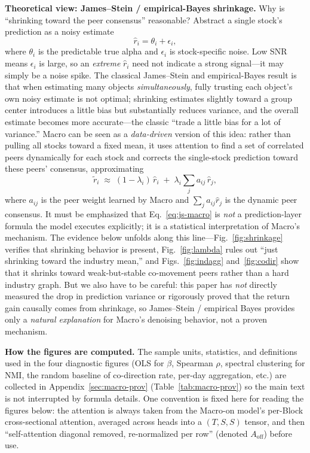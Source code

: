 \documentclass[a4paper,11pt]{article}
\begin{document}
\textbf{Theoretical view: James--Stein / empirical-Bayes shrinkage.} Why
is ``shrinking toward the peer consensus'' reasonable? Abstract a single
stock's prediction as a noisy estimate
\begin{equation}\label{eq:js}
\hat r_i = \theta_i + \epsilon_i,
\end{equation}
where $\theta_i$ is the predictable true alpha and $\epsilon_i$ is
stock-specific noise. Low SNR means $\epsilon_i$ is large, so an \emph{extreme}
$\hat r_i$ need not indicate a strong signal---it may simply be a noise spike.
The classical James--Stein and empirical-Bayes result is that when estimating
many objects \emph{simultaneously}, fully trusting each object's own noisy
estimate is not optimal; shrinking estimates slightly toward a group center
introduces a little bias but substantially reduces variance, and the overall
estimate becomes more accurate---the classic ``trade a little bias for a lot
of variance.'' Macro can be seen as a \emph{data-driven} version of this idea:
rather than pulling all stocks toward a fixed mean, it uses attention to find a
set of correlated peers dynamically for each stock and corrects the
single-stock prediction toward these peers' consensus, approximating
\begin{equation}\label{eq:js-macro}
\tilde r_i \;\approx\; (1-\lambda_i)\,\hat r_i \;+\; \lambda_i \sum_j a_{ij}\,\hat r_j,
\end{equation}
where $a_{ij}$ is the peer weight learned by Macro and $\sum_j a_{ij}\hat r_j$
is the dynamic peer consensus. It must be emphasized that
Eq.~\eqref{eq:js-macro} is \emph{not} a prediction-layer formula the model
executes explicitly; it is a statistical interpretation of Macro's mechanism.
The evidence below unfolds along this line---Fig.~\ref{fig:shrinkage} verifies
that shrinking behavior is present, Fig.~\ref{fig:lambda} rules out ``just
shrinking toward the industry mean,'' and Figs.~\ref{fig:indagg}
and~\ref{fig:codir} show that it shrinks toward weak-but-stable co-movement
peers rather than a hard industry graph. But we also have to be careful: this
paper has \emph{not} directly measured the drop in prediction variance or
rigorously proved that the return gain causally comes from shrinkage, so
James--Stein / empirical Bayes provides only a \emph{natural explanation} for
Macro's denoising behavior, not a proven mechanism.

\textbf{How the figures are computed.} The sample units, statistics, and
definitions used in the four diagnostic figures (OLS for $\beta$, Spearman
$\rho$, spectral clustering for NMI, the random baseline of co-direction rate,
per-day aggregation, etc.) are collected in Appendix~\ref{sec:macro-prov}
(Table~\ref{tab:macro-prov}) so the main text is not interrupted by formula
details. One convention is fixed here for reading the figures below: the
attention is always taken from the Macro-on model's per-Block cross-sectional
attention, averaged across heads into a $(T,S,S)$ tensor, and then
``self-attention diagonal removed, re-normalized per row'' (denoted
$A_{\mathrm{off}}$) before use.
\end{document}
